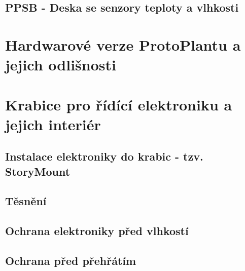 \subsection*{PPSB - Deska se senzory teploty a vlhkosti}

\section{Hardwarové verze ProtoPlantu a jejich odlišnosti}

\section{Krabice pro řídící elektroniku a jejich interiér}

\subsection*{Instalace elektroniky do krabic - tzv. StoryMount}

\subsection*{Těsnění}

\subsection*{Ochrana elektroniky před vlhkostí}

\subsection*{Ochrana před přehřátím}

\newpage